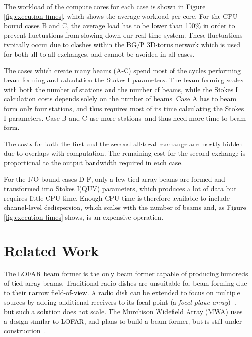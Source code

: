 \documentclass{llncs}
\begin{document}
The workload of the compute cores for each case is shown in Figure \ref{fig:execution-times}, which shows the average workload per core. For the CPU-bound cases B and C, the average load has to be lower than 100\% in order to prevent fluctuations from slowing down our real-time system. These fluctuations typically occur due to clashes within the BG/P 3D-torus network which is used for both all-to-all-exchanges, and cannot be avoided in all cases.

The cases which create many beams (A-C) spend most of the cycles performing beam forming and calculation the Stokes I parameters. The beam forming scales with both the number of stations and the number of beams, while the Stokes I calculation costs depends solely on the number of beams. Case A has to beam form only four stations, and thus requires most of its time calculating the Stokes I parameters. Case B and C use more stations, and thus need more time to beam form.

The costs for both the first and the second all-to-all exchange are mostly hidden due to overlaps with computation. The remaining cost for the second exchange is proportional to the output bandwidth required in each case.

For the I/O-bound cases D-F, only a few tied-array beams are formed and transformed into Stokes I(QUV) parameters, which produces a lot of data but requires little CPU time. Enough CPU time is therefore available to include channel-level dedispersion, which scales with the number of beams and, as Figure \ref{fig:execution-times} shows, is an expensive operation.




\section{Related Work}

The LOFAR beam former is the only beam former capable of producing hundreds of tied-array beams. Traditional radio dishes are unsuitable for beam forming due to their narrow field-of-view. A radio dish can be extended to focus on multiple sources by adding additional receivers to its focal point (a \emph{focal plane array})~\cite{Staveley-Smith:96}, but such a solution does not scale. The Murchison Widefield Array (MWA) uses a design similar to LOFAR, and plans to build a beam former, but is still under construction~\cite{Lonsdale:09}.
\end{document}

